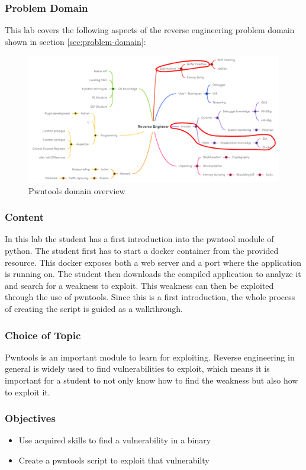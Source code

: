 \subsubsection*{Problem Domain}
This lab covers the following aspects of the reverse engineering problem domain shown in section \ref{sec:problem-domain}:
\vspace{-2ex}
\begin{figure}[H]
    \includegraphics[width=\textwidth]{resources/pwntools-overview-light.png}
    \caption{Pwntools domain overview}
    \label{fig:pwntools-overview}
\end{figure}
\subsubsection*{Content}
In this lab the student has a first introduction into the pwntool module of python. The student first has to start a docker container from the provided resource. This docker exposes both a web server and a port where the application is running on. The student then downloads the compiled application to analyze it and search for a weakness to exploit. This weakness can then be exploited through the use of pwntools. Since this is a first introduction, the whole process of creating the script is guided as a walkthrough.
\subsubsection*{Choice of Topic}
Pwntools is an important module to learn for exploiting. Reverse engineering in general is widely used to find vulnerabilities to exploit, which means it is important for a student to not only know how to find the weakness but also how to exploit it.
\subsubsection*{Objectives}
\begin{itemize}
    \item Use acquired skills to find a vulnerability in a binary
    \item Create a pwntools script to exploit that vulnerabilty
\end{itemize}
